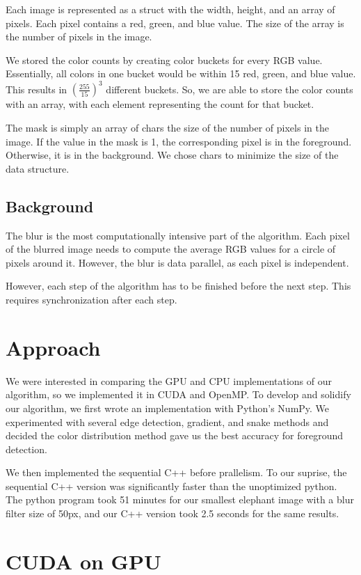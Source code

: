 \documentclass[12pt]{article}
\begin{document}
Each image is represented as a struct with the width, height, and an array of
pixels. Each pixel contains a red, green, and blue value. The size of the array
is the number of pixels in the image.

We stored the color counts by creating color buckets for every RGB value.
Essentially, all colors in one bucket would be within 15 red, green, and blue
value. This results in $\left(\tfrac{255}{15}\right)^3$ different buckets. So,
we are able to store the color counts with an array, with each element
representing the count for that bucket.

The mask is simply an array of chars the size of the number of pixels in the
image. If the value in the mask is 1, the corresponding pixel is in the
foreground. Otherwise, it is in the background. We chose chars to minimize the
size of the data structure.

\subsection{Background}

The blur is the most computationally intensive part of the algorithm. Each
pixel of the blurred image needs to compute the average RGB values for a circle
of pixels around it. However, the blur is data parallel, as each pixel is
independent.

However, each step of the algorithm has to be finished before the next step.
This requires synchronization after each step.

\section{Approach}

We were interested in comparing the GPU and CPU implementations of our
algorithm, so we implemented it in CUDA and OpenMP. To develop and solidify our
algorithm, we first wrote an implementation with Python's NumPy.
We experimented with several edge detection, gradient, and snake methods and
decided the color distribution method gave us the best accuracy for foreground
detection.

We then implemented the sequential C++ before prallelism. To our suprise, the
sequential C++ version was significantly faster than the unoptimized python. The
python program took 51 minutes for our smallest elephant image with a blur
filter size of 50px, and our C++ version took 2.5 seconds for the same results.

\section{CUDA on GPU}
\end{document}
